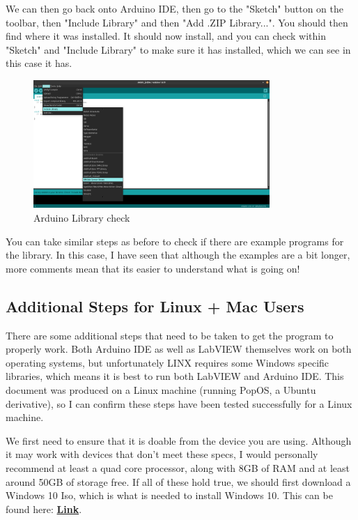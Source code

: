 \documentclass[a4paper,11pt]{report}
\let\oldhref\href %
\renewcommand{\href}[2]{\oldhref{#1}{\bfseries#2}}
\begin{document}
We can then go back onto Arduino IDE, then go to the "Sketch" button on the toolbar, then "Include Library" and then "Add .ZIP Library...". You should then find where it was installed. It should now install, and you can check within "Sketch" and "Include Library" to make sure it has installed, which we can see in this case it has.

\begin{figure}[H]
\centering
\includegraphics[width=0.8\textwidth]{screenshots/arduinolibraryinstallcheck}
\caption{Arduino Library check}
\end{figure}

You can take similar steps as before to check if there are example programs for the library. In this case, I have seen that although the examples are a bit longer, more comments mean that its easier to understand what is going on!

\subsection{Additional Steps for Linux + Mac Users}

There are some additional steps that need to be taken to get the program to properly work. Both Arduino IDE as well as LabVIEW themselves work on both operating systems, but unfortunately LINX requires some Windows specific libraries, which means it is best to run both LabVIEW and Arduino IDE. This document was produced on a Linux machine (running PopOS, a Ubuntu derivative), so I can confirm these steps have been tested successfully for a Linux machine.

We first need to ensure that it is doable from the device you are using. Although it may work with devices that don't meet these specs, I would personally recommend at least a quad core processor, along with 8GB of RAM and at least around 50GB of storage free. If all of these hold true, we should first download a Windows 10 Iso, which is what is needed to install Windows 10. This can be found here: \href{https://www.microsoft.com/en-gb/software-download/windows10ISO}{Link}.
\end{document}
